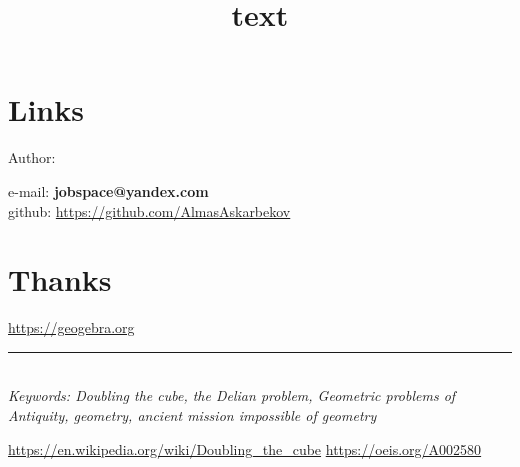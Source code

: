 \documentclass[12pt, letterpaper, oneside]{report}
\begin{document}
\newpage


\begin{minipage}{0.8\textwidth}

\title{text}

	
\section{Links}

\large Author:

e-mail: \textbf{jobspace@yandex.com} \\
github: \url{https://github.com/AlmasAskarbekov}

\section{Thanks}
\url{https://geogebra.org}
\\

\end{minipage}
\vspace{365pt}
\hrule
\ 
\\
\emph{Keywords: Doubling the cube, the Delian problem, Geometric problems of Antiquity, geometry, ancient mission impossible of geometry}




\begin{thebibliography}{5}
\url{https://en.wikipedia.org/wiki/Doubling_the_cube}
\url{https://oeis.org/A002580}
\end{thebibliography}

\vspace{465pt}

\end{document}
